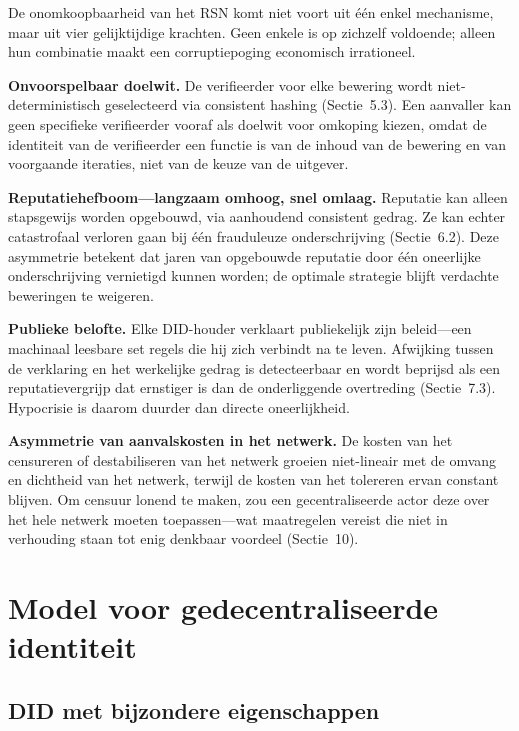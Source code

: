 \documentclass[11pt,a4paper,twocolumn]{article}
\begin{document}
De onomkoopbaarheid van het RSN komt niet voort uit één enkel mechanisme, maar uit vier gelijktijdige krachten. Geen enkele is op zichzelf voldoende; alleen hun combinatie maakt een corruptiepoging economisch irrationeel.

\textbf{Onvoorspelbaar doelwit.} De verifieerder voor elke bewering wordt niet-deterministisch geselecteerd via consistent hashing (Sectie~5.3). Een aanvaller kan geen specifieke verifieerder vooraf als doelwit voor omkoping kiezen, omdat de identiteit van de verifieerder een functie is van de inhoud van de bewering en van voorgaande iteraties, niet van de keuze van de uitgever.

\textbf{Reputatiehefboom---langzaam omhoog, snel omlaag.} Reputatie kan alleen stapsgewijs worden opgebouwd, via aanhoudend consistent gedrag. Ze kan echter catastrofaal verloren gaan bij één frauduleuze onderschrijving (Sectie~6.2). Deze asymmetrie betekent dat jaren van opgebouwde reputatie door één oneerlijke onderschrijving vernietigd kunnen worden; de optimale strategie blijft verdachte beweringen te weigeren.

\textbf{Publieke belofte.} Elke DID-houder verklaart publiekelijk zijn beleid---een machinaal leesbare set regels die hij zich verbindt na te leven. Afwijking tussen de verklaring en het werkelijke gedrag is detecteerbaar en wordt beprijsd als een reputatievergrijp dat ernstiger is dan de onderliggende overtreding (Sectie~7.3). Hypocrisie is daarom duurder dan directe oneerlijkheid.

\textbf{Asymmetrie van aanvalskosten in het netwerk.} De kosten van het censureren of destabiliseren van het netwerk groeien niet-lineair met de omvang en dichtheid van het netwerk, terwijl de kosten van het tolereren ervan constant blijven. Om censuur lonend te maken, zou een gecentraliseerde actor deze over het hele netwerk moeten toepassen---wat maatregelen vereist die niet in verhouding staan tot enig denkbaar voordeel (Sectie~10).

\section{Model voor gedecentraliseerde identiteit}

\subsection{DID met bijzondere eigenschappen}
\end{document}
